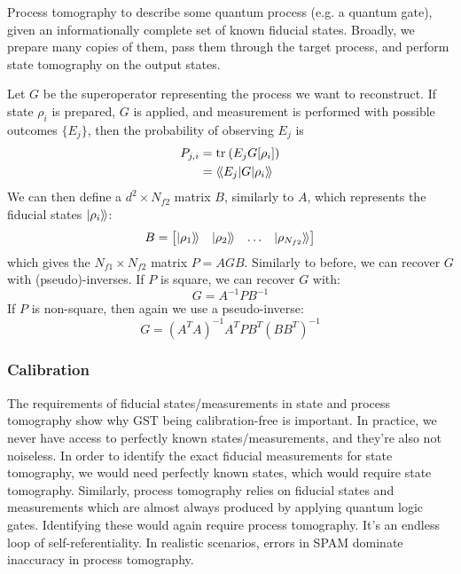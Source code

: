 Process tomography to describe some quantum process (e.g. a quantum gate), given an informationally
complete set of known fiducial states. Broadly, we prepare many copies of them, pass them through
the target process, and perform state tomography on the output states.

Let $G$ be the superoperator representing the process we want to reconstruct. If state $\rho_i$ is
prepared, $G$ is applied, and measurement is performed with possible outcomes $\{E_j\}$, then the
probability of observing $E_j$ is
\begin{equation}
    \begin{aligned}
        P_{j,i} &= \text{tr}_{}\left(E_j G[\rho_i]\right) \\
               &= \langle\!\braket{E_j | G | \rho_i}\!\rangle
    \end{aligned}
\end{equation}
We can then define a $d^2 \times N_{f2}$ matrix $B$, similarly to $A$, which represents the fiducial
states $\ket{\rho_i}\!\rangle$:
\begin{equation}
    B = 
    \begin{bmatrix}
        \ket{\rho_1}\!\rangle & \ket{\rho_2}\!\rangle & \dots & \ket{\rho_{N_{f2}}}\!\rangle
    \end{bmatrix}
\end{equation}
which gives the $N_{f1} \times N_{f2}$ matrix $P = AGB$. Similarly to before, we can recover $G$
with (pseudo)-inverses. If $P$ is square, we can recover $G$ with:
\begin{equation}
    G = A^{-1} P B^{-1}
\end{equation}
If $P$ is non-square, then again we use a pseudo-inverse:
\begin{equation}
    G = (A^T A)^{-1} A^T P B^T (B B^T)^{-1}
\end{equation}

\subsubsection{Calibration}

The requirements of fiducial states/measurements in state and process tomography show why GST being
calibration-free is important. In practice, we never have access to perfectly known
states/measurements, and they're also not noiseless. In order to identify the exact fiducial
measurements for state tomography, we would need perfectly known states, which would require state
tomography.  Similarly, process tomography relies on fiducial states and measurements which are
almost always produced by applying quantum logic gates. Identifying these would again require
process tomography. It's an endless loop of self-referentiality. In realistic scenarios, errors in
\ac{SPAM} dominate inaccuracy in process tomography.

